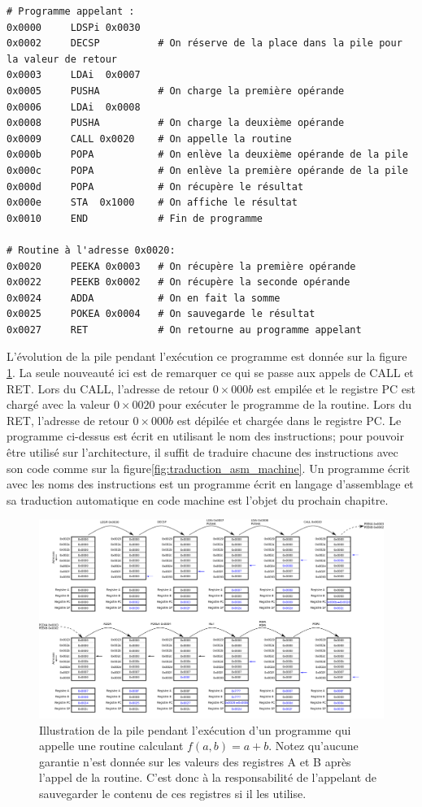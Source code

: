 \begin{verbatim}
# Programme appelant :
0x0000     LDSPi 0x0030
0x0002     DECSP          # On réserve de la place dans la pile pour la valeur de retour
0x0003     LDAi  0x0007
0x0005     PUSHA          # On charge la première opérande
0x0006     LDAi  0x0008
0x0008     PUSHA          # On charge la deuxième opérande
0x0009     CALL 0x0020    # On appelle la routine
0x000b     POPA           # On enlève la deuxième opérande de la pile
0x000c     POPA           # On enlève la première opérande de la pile
0x000d     POPA           # On récupère le résultat
0x000e     STA  0x1000    # On affiche le résultat
0x0010     END            # Fin de programme

# Routine à l'adresse 0x0020:
0x0020     PEEKA 0x0003   # On récupère la première opérande
0x0022     PEEKB 0x0002   # On récupère la seconde opérande
0x0024     ADDA           # On en fait la somme
0x0025     POKEA 0x0004   # On sauvegarde le résultat
0x0027     RET            # On retourne au programme appelant
\end{verbatim}

L'évolution de la pile pendant l'exécution ce programme est donnée sur la figure \ref{fig:stack_ab}. La seule nouveauté ici est de remarquer ce qui se passe aux appels de CALL et RET. Lors du CALL, l'adresse de retour $0\times000b$ est empilée et le registre PC est chargé avec la valeur $0\times0020$ pour exécuter le programme de la routine. Lors du RET, l'adresse de retour $0\times000b$ est dépilée et chargée dans le registre PC. Le programme ci-dessus est écrit en utilisant le nom des instructions; pour pouvoir être utilisé sur l'architecture, il suffit de traduire chacune des instructions avec son code comme sur la figure\ref{fig:traduction_asm_machine}. Un programme écrit avec les noms des instructions est un programme écrit en langage d'assemblage et sa traduction automatique en code machine est l'objet du prochain chapitre.

\begin{figure}[htbp]
\includegraphics[width=\linewidth]{Figs/stack_call_ret.pdf}
\caption{\label{fig:stack_ab} Illustration de la pile pendant l'exécution d'un programme qui appelle une routine calculant $f(a,b) = a+b$. Notez qu'aucune garantie n'est donnée sur les valeurs des registres A et B après l'appel de la routine. C'est donc à la responsabilité de l'appelant de sauvegarder le contenu de ces registres si il les utilise.}
\end{figure}

